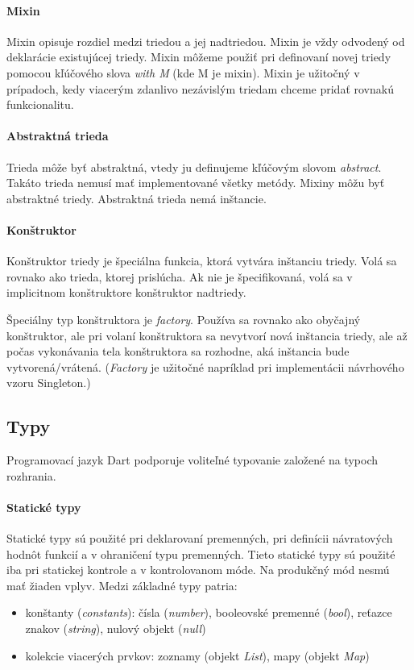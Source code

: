 \paragraph{Mixin}
\label{par:mixins}
Mixin opisuje rozdiel medzi triedou a jej nadtriedou. Mixin je vždy odvodený od deklarácie existujúcej triedy.
Mixin môžeme použiť pri definovaní novej triedy pomocou kľúčového slova \emph{with M} (kde M je mixin).
Mixin je užitočný v prípadoch, kedy viacerým zdanlivo nezávislým triedam chceme pridať rovnakú funkcionalitu.

\paragraph{Abstraktná trieda}
Trieda môže byť abstraktná, vtedy ju definujeme kľúčovým slovom \emph{abstract}. Takáto trieda nemusí mať implementované všetky metódy. Mixiny môžu byť abstraktné triedy. Abstraktná trieda nemá inštancie.

\paragraph{Konštruktor}
Konštruktor triedy je špeciálna funkcia, ktorá vytvára inštanciu triedy. Volá sa rovnako ako trieda, ktorej prislúcha. 
Ak nie je špecifikovaná, volá sa v implicitnom konštruktore konštruktor nadtriedy. %

Špeciálny typ konštruktora je \emph{factory}. Používa sa rovnako ako obyčajný konštruktor, ale pri volaní konštruktora sa nevytvorí nová inštancia triedy, ale až počas vykonávania tela konštruktora sa rozhodne, aká inštancia bude vytvorená/vrátená. (\emph{Factory} je užitočné napríklad pri implementácii návrhového vzoru Singleton.)

\subsection{Typy}
\label{subsec:typy}
Programovací jazyk Dart podporuje voliteľné typovanie založené na typoch rozhrania.

\paragraph{Statické typy}
Statické typy sú použité pri deklarovaní premenných, pri definícii návratových hodnôt funkcií a v ohraničení typu premenných. 
Tieto statické typy sú použité iba pri statickej kontrole a v kontrolovanom móde. Na produkčný mód nesmú mať žiaden vplyv.
Medzi základné typy patria:
\begin{itemize}
\item konštanty (\emph{constants}): čísla (\emph{number}), booleovské premenné (\emph{bool}), reťazce znakov (\emph{string}), nulový objekt (\emph{null})
\item kolekcie viacerých prvkov: zoznamy (objekt \emph{List}), mapy (objekt \emph{Map})
\end{itemize}

